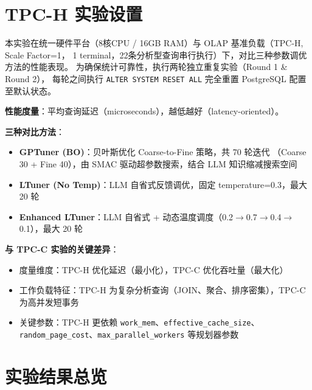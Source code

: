 

\section{TPC-H 实验设置}

本实验在统一硬件平台（8核CPU / 16GB RAM）与 OLAP 基准负载（TPC-H, Scale Factor=1，
1 terminal，22条分析型查询串行执行）下，对比三种参数调优方法的性能表现。
为确保统计可靠性，执行两轮独立重复实验（Round 1 \& Round 2），
每轮之间执行 \texttt{ALTER SYSTEM RESET ALL} 完全重置 PostgreSQL 配置至默认状态。

\textbf{性能度量}：平均查询延迟（microseconds），越低越好（latency-oriented）。

\textbf{三种对比方法}：
\begin{itemize}
  \item \textbf{GPTuner (BO)}：贝叶斯优化 Coarse-to-Fine 策略，共 70 轮迭代
        （Coarse 30 + Fine 40），由 SMAC 驱动超参数搜索，结合 LLM 知识缩减搜索空间
  \item \textbf{LTuner (No Temp)}：LLM 自省式反馈调优，固定 temperature=0.3，最大 20 轮
  \item \textbf{Enhanced LTuner}：LLM 自省式 + 动态温度调度（0.2$\to$0.7$\to$0.4$\to$0.1），最大 20 轮
\end{itemize}

\textbf{与 TPC-C 实验的关键差异}：
\begin{itemize}
  \item 度量维度：TPC-H 优化延迟（最小化），TPC-C 优化吞吐量（最大化）
  \item 工作负载特征：TPC-H 为复杂分析查询（JOIN、聚合、排序密集），TPC-C 为高并发短事务
  \item 关键参数：TPC-H 更依赖 \texttt{work\_mem}、\texttt{effective\_cache\_size}、
        \texttt{random\_page\_cost}、\texttt{max\_parallel\_workers} 等规划器参数
\end{itemize}



\section{实验结果总览}

